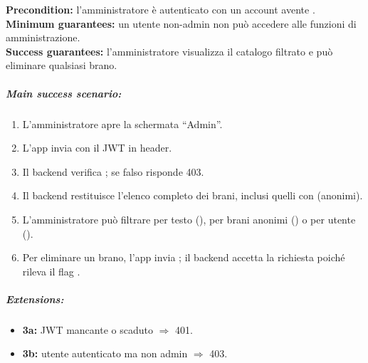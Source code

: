 \textbf{Precondition:} l'amministratore è autenticato con un account
avente .\\
\textbf{Minimum guarantees:} un utente non-admin non può accedere alle
funzioni di amministrazione.\\
\textbf{Success guarantees:} l'amministratore visualizza il catalogo
filtrato e può eliminare qualsiasi brano.

\subparagraph{Main success scenario:}
\begin{enumerate}
    \item L'amministratore apre la schermata ``Admin''.
    \item L'app invia  con il JWT in header.
    \item Il backend verifica ; se falso risponde 403.
    \item Il backend restituisce l'elenco completo dei brani, inclusi
    quelli con  (anonimi).
    \item L'amministratore può filtrare per testo (), per brani
    anonimi () o per utente ().
    \item Per eliminare un brano, l'app invia
    ; il backend accetta la richiesta
    poiché rileva il flag .
\end{enumerate}

\subparagraph{Extensions:}
\begin{itemize}
    \item \textbf{3a:} JWT mancante o scaduto $\Rightarrow$ 401.
    \item \textbf{3b:} utente autenticato ma non admin $\Rightarrow$ 403.
\end{itemize}

